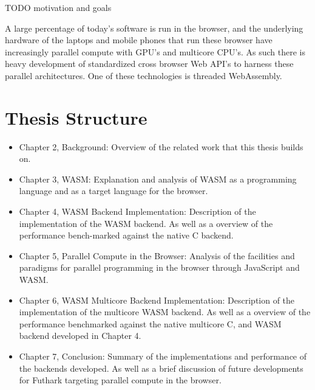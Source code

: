 \documentclass[11pt]{book}
\begin{document}
TODO motivation and goals


A large percentage of today's software is run in the browser, and the underlying hardware of the laptops and mobile phones that run these browser have increasingly parallel compute with GPU's and multicore CPU's. As such there is heavy development of standardized cross browser Web API's to harness these parallel architectures. One of these technologies is threaded WebAssembly. %



\setcounter{page}{1}
\section{Thesis Structure}


\begin{itemize}
    \item Chapter 2, Background:
    Overview of the related work that this thesis builds on.

    \item Chapter 3, WASM:
    Explanation and analysis of WASM as a programming language and as a target language for the browser. 
    
    \item Chapter 4, WASM  Backend Implementation:
     Description of the implementation of the WASM backend. As well as a overview of the performance bench-marked against the native C backend.
    
    \item Chapter 5, Parallel Compute in the Browser:
    Analysis of the facilities and paradigms for parallel programming in the browser through JavaScript and WASM. 
    
    \item Chapter 6, WASM Multicore Backend Implementation:
    Description of the implementation of the multicore WASM backend. As well as a overview of the performance benchmarked against the native multicore C, and WASM backend developed in Chapter 4.
    
    \item Chapter 7, Conclusion:
    Summary of the implementations and performance of the backends developed. As well as a brief discussion of future developments for Futhark targeting parallel compute in the browser.
    
\end{itemize}
\end{document}
